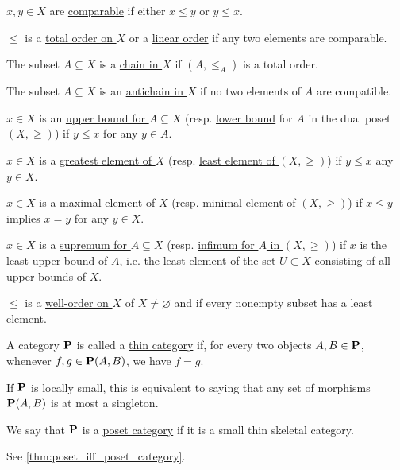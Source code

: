 \begin{definition}
\begin{defenum}
    \item\label{def:poset/comparable_elements} $x, y \in X$ are \ul{comparable} if either $x \leq y$ or $y \leq x$.
    \item\label{def:poset/total_order} $\leq$ is a \ul{total order on $X$} or a \ul{linear order} if any two elements are comparable.
    \item\label{def:poset/chain} The subset $A \subseteq X$ is a \ul{chain in $X$} if $(A, \leq_A)$ is a total order.
    \item\label{def:poset/antichain} The subset $A \subseteq X$ is an \ul{antichain in $X$} if no two elements of $A$ are compatible.
    \item\label{def:poset/upper_lower_bound} $x \in X$ is an \ul{upper bound for $A \subseteq X$} (resp. \ul{lower bound} for $A$ in the dual poset $(X, \geq)$) if $y \leq x$ for any $y \in A$.
    \item\label{def:poset/greatest_least_element} $x \in X$ is a \ul{greatest element of $X$} (resp. \ul{least element of $(X, \geq)$}) if $y \leq x$ any $y \in X$.
    \item\label{def:poset/maximal_minimal_element} $x \in X$ is a \ul{maximal element of $X$} (resp. \ul{minimal element of $(X, \geq)$}) if $x \leq y$ implies $x = y$ for any $y \in X$.
    \item\label{def:poset/supremum_infimum} $x \in X$ is a \ul{supremum for $A \subseteq X$} (resp. \ul{infimum for $A$ in $(X, \geq)$}) if $x$ is the least upper bound of $A$, i.e. the least element of the set $U \subset X$ consisting of all upper bounds of $X$.
    \item\label{def:poset/well_order} $\leq$ is a \ul{well-order on $X$} of $X \neq \varnothing$ and if every nonempty subset has a least element.
  \end{defenum}
\end{definition}

\begin{definition}\label{def:thin_category}\cite{nLab:thin_category}
  A category $\operatorname{\mathbf{P}}$ is called a \ul{thin category} if, for every two objects $A, B \in \operatorname{\mathbf{P}}$, whenever $f, g \in \operatorname{\mathbf{P}}(A, B)$, we have $f = g$.

  If $\operatorname{\mathbf{P}}$ is locally small, this is equivalent to saying that any set of morphisms $\operatorname{\mathbf{P}}(A, B)$ is at most a singleton.
\end{definition}

\begin{definition}\label{def:poset_category}
  We say that $\operatorname{\mathbf{P}}$ is a \ul{poset category} if it is a small thin skeletal category.

  See \cref{thm:poset_iff_poset_category}.
\end{definition}

